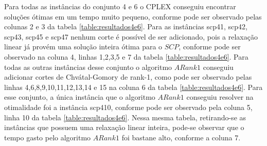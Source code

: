 Para todas as instâncias do conjunto 4 e 6 o CPLEX conseguiu encontrar soluções ótimas em um tempo muito pequeno, conforme
pode ser observado pelas colunas 2 e 3 da tabela \ref{table:resultados4e6}. Para as instâncias scp41, scp42, scp43, scp45
e scp47 nenhum corte é possível de ser adicionado, pois a relaxação linear já provém uma solução inteira ótima para o $SCP$, conforme
pode ser observado na coluna 4, linhas 1,2,3,5 e 7 da tabela \ref{table:resultados4e6}. Para todas as outras instâncias
desse conjunto o algoritmo $ARank1$ conseguiu adicionar cortes de Chvátal-Gomory de rank-1, como pode ser observado
pelas linhas 4,6,8,9,10,11,12,13,14 e 15 na coluna 6 da tabela \ref{table:resultados4e6}. Para esse conjunto, a única 
instância que o algoritmo $ARank1$ conseguiu resolver na otimalidade foi a instância scp410, conforme pode ser observado
pela coluna 5, linha 10 da tabela \ref{table:resultados4e6}. Nessa mesma tabela, retirando-se as instâncias que possuem
uma relaxação linear inteira,  pode-se observar que o tempo gasto pelo algoritmo $ARank1$ foi bastane alto, conforme a coluna
7.

